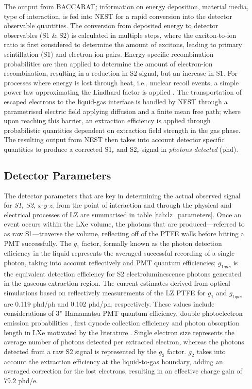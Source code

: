 The output from \textsc{BACCARAT}; information on energy deposition, material media, type of interaction, is fed into NEST for a rapid conversion into the detector observable quantities. The conversion from deposited energy to detector observables (S1 \& S2) is calculated in multiple steps, where the exciton-to-ion ratio is first considered to determine the amount of excitons, leading to primary scintillation (S1) and electron-ion pairs. Energy-specific recombination probabilities are then applied to determine the amount of electron-ion recombination, resulting in a reduction in S2 signal, but an increase in S1. For processes where energy is lost through heat, i.e., nuclear recoil events, a simple power law approximating the Lindhard factor is applied \cite{Lindhard, Lindhard_2}. The transportation of escaped electrons to the liquid-gas interface is handled by NEST through a parametrised electric field applying diffusion and a finite mean free path; where upon reaching this barrier, an extraction efficiency is applied through probabilistic quantities dependent on extraction field strength in the gas phase. The resulting output from NEST then takes into account detector specific quantities to produce a corrected S1$_{c}$ and S2$_{c}$ signal in \textit{photons detected} (phd).


\subsection{Detector Parameters}
\label{secsec:detector_param}

%

%

The detector parameters that are key in determining the actual observed signal for \textit{S1, S2, x-y-z}, from the point of interaction and through the physical and electrical processes of LZ are summarised in table \ref{tab:lz_parameters}. Once an event occurs within the LXe volume, the photons that are produced---referred to as raw S1---traverse the volume, reflecting off of the PTFE walls before hitting a PMT successfully. The $g_{1}$ factor, formally known as the photon detection efficiency in the liquid represents the averaged successful recording of a single photon, taking into account reflectively and PMT quantum efficiencies; $g_{1gas}$ is the equivalent detection efficiency for S2 electroluminescence photons generated in the gaseous extraction region. The current estimates derived from optical simulations based on reflectively measurements of the LZ PTFE \cite{Neves_2017, Haefner_2017} for $g_{1}$ and $g_{1gas}$ are 0.119 phd/ph and 0.102 phd/ph, respectively. These values include considerations of 3'' Hamamatsu PMT quantum efficiency, double photoelectron emission probabilities \cite{L_pez_Paredes_2018}, first dynode collection efficiency and photon absorption length in LXe motivated by the literature \cite{lux_signal_yields}. Single electron size represents the average number of photons detected per extracted electron, whereas the photons detected from a raw S2 signal is represented by the $g_{2}$ factor. $g_{2}$ takes into account the extraction efficiency at the liquid-to-gas boundary, adding an averaged correction for the lost electrons, resulting in an effective charge gain of 79.2 phd/e.

